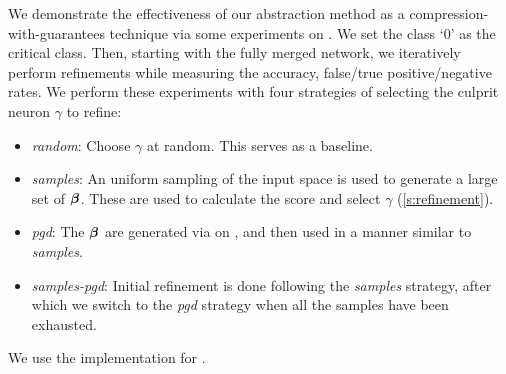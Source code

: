 We demonstrate the effectiveness of our abstraction method as a
compression-with-guarantees technique via some experiments on \mnist. We set the
class `0'
as the critical class. Then, starting with the fully merged network, we
iteratively perform refinements while measuring the accuracy, false/true
positive/negative rates. We perform these experiments with four strategies of
selecting the culprit neuron $\gamma$ to refine:

\begin{itemize}
    \item \textit{random}: Choose $\gamma$ at random. This serves as a
        baseline.
    \item \textit{samples}: An uniform sampling of the input space is used to
        generate a large set of \gencex $\boldsymbol{\beta}$. These are used to
        calculate the score and select $\gamma$ (\ref{s:refinement}).
    \item \textit{pgd}: The $\boldsymbol{\beta}$ are generated via \pgd on \abs, and
        then used in a manner similar to \textit{samples}.
    \item \textit{samples-pgd}: Initial refinement is done following the
        \textit{samples} strategy, after which we switch to the \textit{pgd}
        strategy when all the samples have been exhausted.
\end{itemize}

We use the \abcrown implementation for \pgd.

